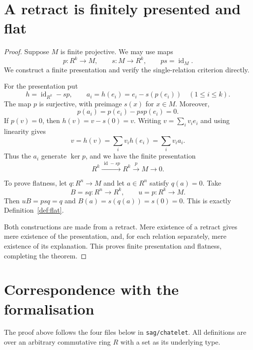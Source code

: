 \documentclass[11pt]{amsart}
\theoremstyle{definition}
\newcommand{\id}{\operatorname{id}}
\newcommand{\code}[1]{\texttt{#1}}
\begin{document}
\section{A retract is finitely presented and flat}

\begin{proof}
Suppose $M$ is finite projective. We may use maps
\[
 p:R^k\to M,\qquad s:M\to R^k,\qquad ps=\id_M.
\]
We construct a finite presentation and verify the single-relation
criterion directly.

For the presentation put
\[
 h=\id_{R^k}-sp,\qquad a_i=h(e_i)=e_i-s(p(e_i))\quad(1\leq i\leq k).
\]
The map $p$ is surjective, with preimage $s(x)$ for $x\in M$.
Moreover,
\[
 p(a_i)=p(e_i)-psp(e_i)=0.
\]
If $p(v)=0$, then $h(v)=v-s(0)=v$. Writing $v=\sum_i v_i e_i$ and
using linearity gives
\[
 v=h(v)=\sum_i v_i h(e_i)=\sum_i v_i a_i.
\]
Thus the $a_i$ generate $\ker p$, and we have the finite presentation
\[
 R^k\xrightarrow{\,\id-sp\,}R^k\xrightarrow{p}M\longrightarrow0.
\]

To prove flatness, let $q:R^n\to M$ and let $a\in R^n$ satisfy
$q(a)=0$. Take
\[
 B=sq:R^n\to R^k,\qquad u=p:R^k\to M.
\]
Then $uB=psq=q$ and $B(a)=s(q(a))=s(0)=0$. This is exactly
Definition~\ref{def:flat}.

Both constructions are made from a retract. Mere existence of a
retract gives mere existence of the presentation, and, for each
relation separately, mere existence of its explanation. This proves
finite presentation and flatness, completing the theorem.
\end{proof}

\section*{Correspondence with the formalisation}

The proof above follows the four files below in
\code{sag/chatelet}. All definitions are over an arbitrary
commutative ring $R$ with a set as its underlying type.
\end{document}
